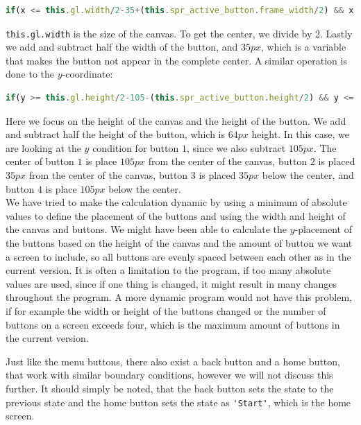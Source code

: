 \begin{lstlisting}[language=JavaScript, caption=x condition check for menu buttons]
if(x <= this.gl.width/2-35+(this.spr_active_button.frame_width/2) && x >= this.gl.width/2-35-(this.spr_active_button.frame_width/2)){...}
\end{lstlisting}

\verb|this.gl.width| is the size of the canvas. To get the center, we divide by 2. Lastly we add and subtract half the width of the button, and $35px$, which is a variable that makes the button not appear in the complete center. A similar operation is done to the $y$-coordinate:

\begin{lstlisting}[language=JavaScript, caption=y condition check for menu buttons]
if(y >= this.gl.height/2-105-(this.spr_active_button.height/2) && y <= this.gl.height/2-105+(this.spr_active_button.frame_height/2)){...}
\end{lstlisting}

Here we focus on the height of the canvas and the height of the button. We add and subtract half the height of the button, which is $64px$ height. In this case, we are looking at the $y$ condition for button $1$, since we also subtract $105px$. The center of button $1$ is place $105px$ from the center of the canvas, button $2$ is placed $35px$ from the center of the canvas, button $3$ is placed $35px$ below the center, and button $4$ is place $105px$ below the center.\\

We have tried to make the calculation dynamic by using a minimum of absolute values to define the placement of the buttons and using the width and height of the canvas and buttons. We might have been able to calculate the $y$-placement of the buttons based on the height of the canvas and the amount of button we want a screen to include, so all buttons are evenly spaced between each other as in the current version. It is often a limitation to the program, if too many absolute values are used, since if one thing is changed, it might result in many changes throughout the program. A more dynamic program would not have this problem, if for example the width or height of the buttons changed or the number of buttons on a screen exceeds four, which is the maximum amount of buttons in the current version.

Just like the menu buttons, there also exist a back button and a home button, that work with similar boundary conditions, however we will not discuss this further. It should simply be noted, that the back button sets the state to the previous state and the home button sets the state as \verb|'Start'|, which is the home screen.